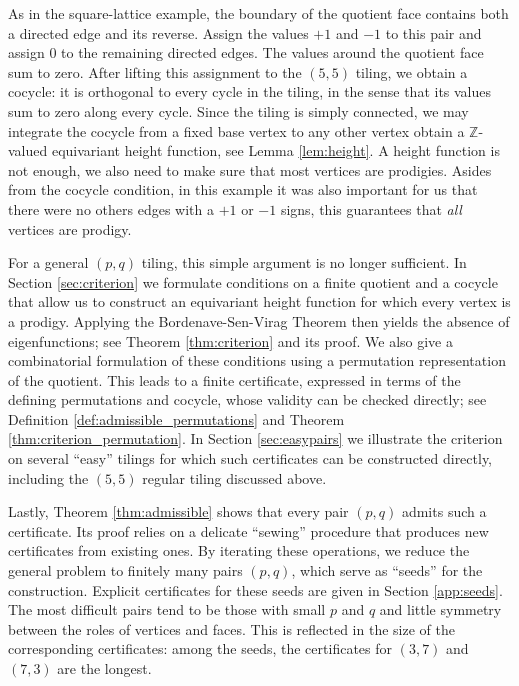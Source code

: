 \documentclass[11pt]{article}
\theoremstyle{remark}
\newcommand{\Z}{\mathbb Z}
\begin{document}
As in the square-lattice example, the boundary of the quotient face contains both a directed edge and its reverse. Assign the values $+1$ and $-1$ to this pair and assign $0$ to the remaining directed edges. The values around the quotient face sum to zero. After lifting this assignment to the $(5,5)$ tiling, we obtain a cocycle: it is orthogonal to every cycle in the tiling, in the sense that its values sum to zero along every cycle. Since the tiling is simply connected, we may  integrate the cocycle from a fixed base vertex to any other vertex obtain a $\Z$-valued equivariant height function, see Lemma \ref{lem:height}. A height function is not enough, we also need to make sure that most vertices are prodigies. Asides from the cocycle condition, in this example it was also important for us that there were no others edges with a $+1$ or $-1$ signs, this guarantees that \emph{all} vertices are prodigy. 

For a general $(p,q)$ tiling, this simple argument is no longer sufficient. In Section \ref{sec:criterion} we formulate conditions on a finite quotient and a cocycle that allow us to construct an equivariant height function for which every vertex is a prodigy. Applying the Bordenave-Sen-Virag Theorem \cite[Theorem 2.3]{BSV17} then yields the absence of eigenfunctions; see Theorem \ref{thm:criterion} and its proof. We also give a combinatorial formulation of these conditions using a permutation representation of the quotient. This leads to a finite certificate, expressed in terms of the defining permutations and cocycle, whose validity can be checked directly; see Definition \ref{def:admissible_permutations} and Theorem \ref{thm:criterion_permutation}. In Section \ref{sec:easypairs} we illustrate the criterion on several ``easy'' tilings for which such certificates can be constructed directly, including the $(5,5)$ regular tiling discussed above.


Lastly, Theorem \ref{thm:admissible} shows that every pair $(p,q)$ admits such a certificate. Its proof relies on a delicate ``sewing'' procedure that produces new certificates from existing ones. By iterating these operations, we reduce the general problem to finitely many pairs $(p,q)$, which serve as ``seeds'' for the construction. Explicit certificates for these seeds are given in Section \ref{app:seeds}. The most difficult pairs tend to be those with small $p$ and $q$ and little symmetry between the roles of vertices and faces. This is reflected in the size of the corresponding certificates: among the seeds, the certificates for $(3,7)$ and $(7,3)$ are the longest.
\end{document}
